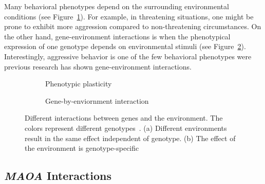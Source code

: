 Many behavioral phenotypes depend on the surrounding environmental conditions (see Figure~\ref{fig:plasticity}).
For example, in threatening situations, one might be prone to exhibit more aggression compared to non-threatening circumstances. 
On the other hand, gene-environment interactions is when the phenotypical expression of one genotype depends on environmental stimuli (see Figure~\ref{fig:gene_env_interaction}).
Interestingly, aggressive behavior is one of the few behavioral phenotypes were previous research has shown gene-environment interactions.

\begin{figure}[!htp]
  \centering
  \begin{subfigure}[t]{0.4\textwidth}
    \centering
    \resizebox{\linewidth}{!}{}
    \caption{Phenotypic plasticity}\label{fig:plasticity}
  \end{subfigure}
  \begin{subfigure}[t]{0.4\textwidth}
    \centering
    \resizebox{\linewidth}{!}{}
    \caption{Gene-by-enviornment interaction}\label{fig:gene_env_interaction}
  \end{subfigure}
  \caption[Gene-Environment Interactions]{Different interactions between genes and the environment. 
    The colors represent different genotypes~\cite{Anholt2012}. 
    (a) Different environments result in the same effect independent of genotype.
    (b) The effect of the environment is genotype-specific}\label{fig:env_interactions}
\end{figure}

\subsection{\textit{MAOA} Interactions}
\label{sub:maoa_interactions}

